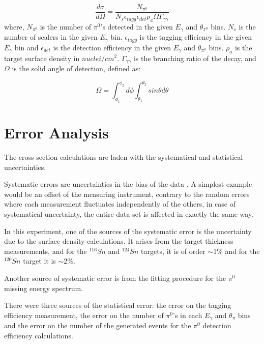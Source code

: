 \begin{equation}
\frac{d\sigma}{d\Omega} = \frac{N_{\pi^{0}}}{N_{s}\epsilon_{tagg}\epsilon_{det}\rho_{a}\Omega\Gamma_{\gamma\gamma}}
\end{equation}
where, $N_{\pi^{0}}$ is the number of $\pi^{0}$'s detected in the given $E_{\gamma}$ and $\theta_{\pi^{0}}$ bins. $N_{s}$ is the number of scalers in the given $E_{\gamma}$ bin. $\epsilon_{tagg}$ is the tagging efficiency in the given $E_{\gamma}$ bin and $\epsilon_{det}$ is the detection efficiency in the given $E_{\gamma}$ and $\theta_{\pi^{0}}$ bins. $\rho_{a}$ is the target surface density in $nuclei/cm^{2}$. $\Gamma_{\gamma\gamma}$ is the branching ratio of the decay, and $\Omega$ is the solid angle of detection, defined as:

\begin{equation}
\Omega = \int_{\phi_{1}}^{\phi_{2}} d\phi \int_{\theta_{1}}^{\theta_{2}}sin\theta d\theta
\end{equation}

\section{Error Analysis}

\indent The cross section calculations are laden with the systematical and statistical uncertainties.

\indent Systematic errors are uncertainties in the bias of the data \cite{leo}. A simplest example would be an offset of the measuring instrument, contrary to the random errors where each measurement fluctuates independently of the others, in case of systematical uncertainty, the entire data set is affected in exactly the same way.

\indent In this experiment, one of the sources of the systematic error is the uncertainty due to the surface density calculations. It arises from the target thickness measurements, and for the $^{116}Sn$ and $^{124}Sn$ targets, it is of order $\sim 1\%$ and for the $^{120}Sn$ target it is $\sim 2\%$.

\indent Another source of systematic error is from the fitting procedure for the $\pi^{0}$ missing energy spectrum. 

\indent There were three sources of the statistical error: the error on the tagging efficiency measurement, the error on the number of $\pi^{0}$'s in each $E_{\gamma}$ and $\theta_{\pi}$ bins and the error on the number of the generated events for the $\pi^{0}$ detection efficiency calculations.

